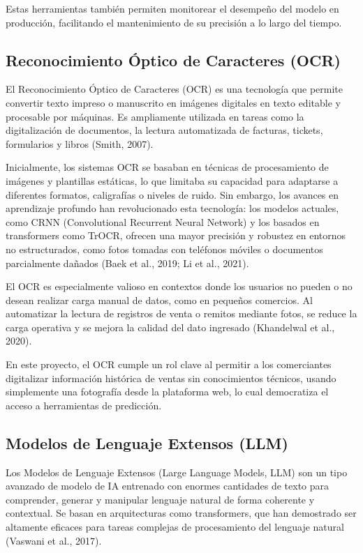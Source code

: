 Estas herramientas también permiten monitorear el desempeño del modelo en producción, facilitando el mantenimiento de su precisión a lo largo del tiempo.

\subsection{Reconocimiento Óptico de Caracteres (OCR)}

\indent El Reconocimiento Óptico de Caracteres (OCR) es una tecnología que permite convertir texto impreso o manuscrito en imágenes digitales en texto editable y procesable por máquinas. Es ampliamente utilizada en tareas como la digitalización de documentos, la lectura automatizada de facturas, tickets, formularios y libros (Smith, 2007).

\indent Inicialmente, los sistemas OCR se basaban en técnicas de procesamiento de imágenes y plantillas estáticas, lo que limitaba su capacidad para adaptarse a diferentes formatos, caligrafías o niveles de ruido. Sin embargo, los avances en aprendizaje profundo han revolucionado esta tecnología: los modelos actuales, como CRNN (Convolutional Recurrent Neural Network) y los basados en transformers como TrOCR, ofrecen una mayor precisión y robustez en entornos no estructurados, como fotos tomadas con teléfonos móviles o documentos parcialmente dañados (Baek et al., 2019; Li et al., 2021).

\indent El OCR es especialmente valioso en contextos donde los usuarios no pueden o no desean realizar carga manual de datos, como en pequeños comercios. Al automatizar la lectura de registros de venta o remitos mediante fotos, se reduce la carga operativa y se mejora la calidad del dato ingresado (Khandelwal et al., 2020).

\indent En este proyecto, el OCR cumple un rol clave al permitir a los comerciantes digitalizar información histórica de ventas sin conocimientos técnicos, usando simplemente una fotografía desde la plataforma web, lo cual democratiza el acceso a herramientas de predicción.


\subsection{Modelos de Lenguaje Extensos (LLM)}

\indent Los Modelos de Lenguaje Extensos (Large Language Models, LLM) son un tipo avanzado de modelo de IA entrenado con enormes cantidades de texto para comprender, generar y manipular lenguaje natural de forma coherente y contextual. Se basan en arquitecturas como transformers, que han demostrado ser altamente eficaces para tareas complejas de procesamiento del lenguaje natural (Vaswani et al., 2017).

